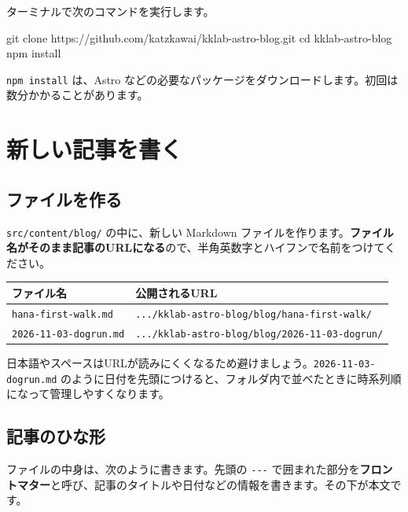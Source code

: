 \documentclass[a4paper,11pt]{ltjsarticle}
\newcommand{\file}[1]{\texttt{#1}}
\begin{document}
ターミナルで次のコマンドを実行します。

\begin{code}
git clone https://github.com/katzkawai/kklab-astro-blog.git
cd kklab-astro-blog
npm install
\end{code}

\file{npm install} は、Astro などの必要なパッケージをダウンロードします。初回は数分かかることがあります。

\section{新しい記事を書く}\label{sec:write}

\subsection{ファイルを作る}

\file{src/content/blog/} の中に、新しい Markdown ファイルを作ります。\textbf{ファイル名がそのまま記事のURLになる}ので、半角英数字とハイフンで名前をつけてください。

\begin{center}
\begin{tabular}{@{}ll@{}}
\toprule
ファイル名 & 公開されるURL \\
\midrule
\file{hana-first-walk.md} & \file{.../kklab-astro-blog/blog/hana-first-walk/} \\
\file{2026-11-03-dogrun.md} & \file{.../kklab-astro-blog/blog/2026-11-03-dogrun/} \\
\bottomrule
\end{tabular}
\end{center}

\begin{hint}[ファイル名のコツ]
日本語やスペースはURLが読みにくくなるため避けましょう。\file{2026-11-03-dogrun.md} のように日付を先頭につけると、フォルダ内で並べたときに時系列順になって管理しやすくなります。
\end{hint}

\subsection{記事のひな形}

ファイルの中身は、次のように書きます。先頭の \texttt{-{}-{}-} で囲まれた部分を\textbf{フロントマター}と呼び、記事のタイトルや日付などの情報を書きます。その下が本文です。
\end{document}
